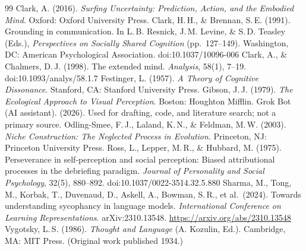 \documentclass[11pt]{article}
\begin{document}
\begin{thebibliography}{99}
 Clark, A. (2016). \emph{Surfing Uncertainty: Prediction, Action, and the Embodied Mind}. Oxford: Oxford University Press.
 Clark, H.\,H., \& Brennan, S.\,E. (1991). Grounding in communication. In L.\,B. Resnick, J.\,M. Levine, \& S.\,D. Teasley (Eds.), \emph{Perspectives on Socially Shared Cognition} (pp.\ 127--149). Washington, DC: American Psychological Association. doi:10.1037/10096-006
 Clark, A., \& Chalmers, D.\,J. (1998). The extended mind. \emph{Analysis}, 58(1), 7--19. doi:10.1093/analys/58.1.7
 Festinger, L. (1957). \emph{A Theory of Cognitive Dissonance}. Stanford, CA: Stanford University Press.
 Gibson, J.\,J. (1979). \emph{The Ecological Approach to Visual Perception}. Boston: Houghton Mifflin.
 Grok Bot (AI assistant). (2026). Used for drafting, code, and literature search; not a primary source.
 Odling-Smee, F.\,J., Laland, K.\,N., \& Feldman, M.\,W. (2003). \emph{Niche Construction: The Neglected Process in Evolution}. Princeton, NJ: Princeton University Press.
 Ross, L., Lepper, M.\,R., \& Hubbard, M. (1975). Perseverance in self-perception and social perception: Biased attributional processes in the debriefing paradigm. \emph{Journal of Personality and Social Psychology}, 32(5), 880--892. doi:10.1037/0022-3514.32.5.880
 Sharma, M., Tong, M., Korbak, T., Duvenaud, D., Askell, A., Bowman, S.\,R., et al.\ (2024). Towards understanding sycophancy in language models. \emph{International Conference on Learning Representations}. arXiv:2310.13548. \url{https://arxiv.org/abs/2310.13548}
 Vygotsky, L.\,S. (1986). \emph{Thought and Language} (A. Kozulin, Ed.). Cambridge, MA: MIT Press. (Original work published 1934.)
\end{thebibliography}
\end{document}
